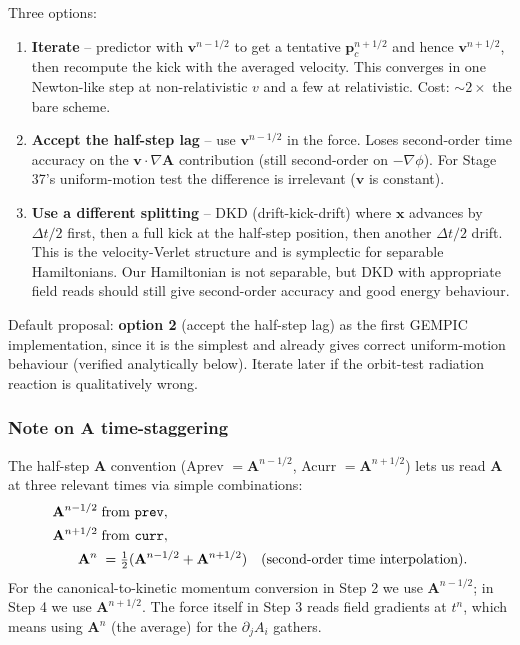 \documentclass[11pt,a4paper]{article}
\newcommand{\vv}[1]{\mathbf{#1}}
\begin{document}
Three options:
\begin{enumerate}
  \item \textbf{Iterate} -- predictor with $\vv{v}^{n-1/2}$ to get
    a tentative $\vv{p}_c^{n+1/2}$ and hence $\vv{v}^{n+1/2}$,
    then recompute the kick with the averaged velocity.  This
    converges in one Newton-like step at non-relativistic $v$
    and a few at relativistic.  Cost: $\sim 2\times$ the bare
    scheme.
  \item \textbf{Accept the half-step lag} -- use $\vv{v}^{n-1/2}$
    in the force.  Loses second-order time accuracy on the
    $\vv{v}\cdot\nabla\vv{A}$ contribution (still
    second-order on $-\nabla\phi$).  For Stage 37's uniform-motion
    test the difference is irrelevant ($\vv{v}$ is constant).
  \item \textbf{Use a different splitting} -- DKD (drift-kick-drift)
    where $\vv{x}$ advances by $\Delta t/2$ first, then a full
    kick at the half-step position, then another $\Delta t/2$
    drift.  This is the velocity-Verlet structure and is
    symplectic for separable Hamiltonians.  Our Hamiltonian is
    not separable, but DKD with appropriate field reads should
    still give second-order accuracy and good energy behaviour.
\end{enumerate}

Default proposal: \textbf{option 2} (accept the half-step lag) as
the first GEMPIC implementation, since it is the simplest and
already gives correct uniform-motion behaviour (verified
analytically below).  Iterate later if the orbit-test radiation
reaction is qualitatively wrong.

\subsubsection*{Note on $\vv{A}$ time-staggering}

The half-step $\vv{A}$ convention (Aprev $= \vv{A}^{n-1/2}$,
Acurr $= \vv{A}^{n+1/2}$) lets us read $\vv{A}$ at three relevant
times via simple combinations:
\begin{align}
\vv{A}^{n-1/2}\;&\text{from \texttt{prev}},\\
\vv{A}^{n+1/2}\;&\text{from \texttt{curr}},\\
\vv{A}^{n}\;&= \tfrac{1}{2}(\vv{A}^{n-1/2} + \vv{A}^{n+1/2})\quad
              \text{(second-order time interpolation)}.
\end{align}
For the canonical-to-kinetic momentum conversion in Step 2 we use
$\vv{A}^{n-1/2}$; in Step 4 we use $\vv{A}^{n+1/2}$.  The force
itself in Step 3 reads field gradients at $t^n$, which means using
$\vv{A}^n$ (the average) for the $\partial_j A_i$ gathers.
\end{document}

